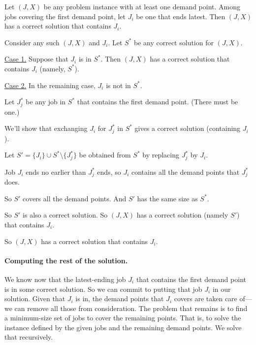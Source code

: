 \begin{lemma}\label{greedy: covering by intervals: first}
  Let $(J, X)$ be any problem instance with at least one demand point.
  Among jobs covering the first demand point,
  let $J_i$ be one that ends latest.
  Then $(J, X)$ has a correct solution that contains $J_i$.
\end{lemma}
\begin{longFormProof}
  \step Consider any such $(J, X)$ and $J_i$. Let $S^*$ be any correct solution for $(J, X)$.  

  \begin{block}
    \step \underline{Case 1.}  Suppose that $J_i$ is in $S^*$.
    \step Then $(J, X)$ has a correct solution that contains $J_i$ (namely, $S^*$).
  \end{block}
  
  \begin{block}
    \step \underline{Case 2.}  In the remaining case, $J_i$ is not in $S^*$.

    \step Let $J_j^*$ be any job in $S^*$ that contains the first demand point.  (There must be one.)

    \step We'll show that exchanging $J_i$ for $J_j^*$ in $S^*$ gives a correct solution (containing $J_i$).

    \step Let $S' = \{J_i\}\cup S^* \setminus \{J^*_j\}$ be obtained from $S^*$ by replacing $J^*_j$ by $J_i$.

    \step Job $J_i$ ends no earlier than $J^*_j$ ends, so $J_i$ contains all the demand points that $J^*_j$ does.
    
    \step So $S'$ covers all the demand points.  And $S'$ has the same size as $S^*$.

    \step So $S'$ is also a correct solution. So $(J, X)$ has a correct solution (namely $S'$) that contains $J_i$.
  \end{block}
  \step So $(J, X)$ has a correct solution that contains $J_i$.
\end{longFormProof}

\paragraph{Computing the rest of the solution.}
We know now that the latest-ending job $J_i$ that contains the first demand point
is in some correct solution.  So we can commit to putting that job $J_i$ in our solution.
Given that $J_i$ is in, the demand points that $J_i$ covers are taken care of---we can remove all those from consideration.
The problem that remains is to find a minimum-size set of jobs to cover the remaining points.
That is, to solve the  instance defined
by the given jobs and the remaining demand points.
We solve that recursively.

